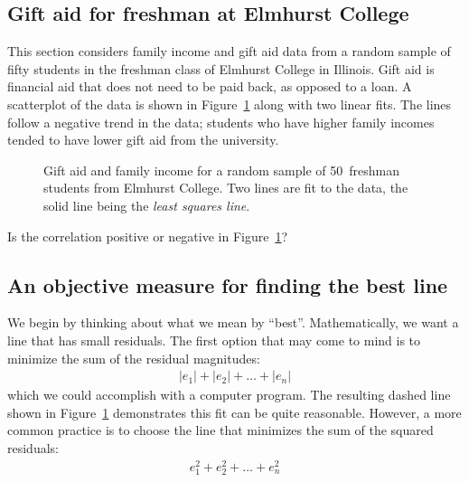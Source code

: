 \subsection{Gift aid for freshman at Elmhurst College}

This section considers family income and gift aid data from
a random sample of fifty students in the freshman class of
Elmhurst College in Illinois.
Gift aid is financial aid that does not need to be paid back,
as opposed to a loan.
A scatterplot of the data is shown in
Figure~\ref{elmhurstScatterW2Lines}
along with two linear fits.
The lines follow a negative trend in the data;
students who have higher family incomes tended to have lower
gift aid from the university.

\begin{figure}[h]
  \centering
  \caption{Gift aid and family income for a random sample of
      50~freshman students from Elmhurst College.
      Two lines are fit to the data, the solid line being the
      \emph{least squares line}.}
  \label{elmhurstScatterW2Lines}
\end{figure}

\begin{exercisewrap}
\begin{nexercise}
Is the correlation positive or negative in Figure~\ref{elmhurstScatterW2Lines}?\footnotemark
\end{nexercise}
\end{exercisewrap}


\subsection{An objective measure for finding the best line}

We begin by thinking about what we mean by ``best''.
Mathematically, we want a line that has small residuals.
The first option that may come to mind is to minimize the
sum of the residual magnitudes:
\begin{align*}
|e_1| + |e_2| + \dots + |e_n|
\end{align*}
which we could accomplish with a computer program.
The resulting dashed line shown in
Figure~\ref{elmhurstScatterW2Lines}
demonstrates this fit can be quite reasonable.
However, a more common practice is to choose the line that
minimizes the sum of the squared residuals:
\begin{align*}
e_{1}^2 + e_{2}^2 + \dots + e_{n}^2
\end{align*}


